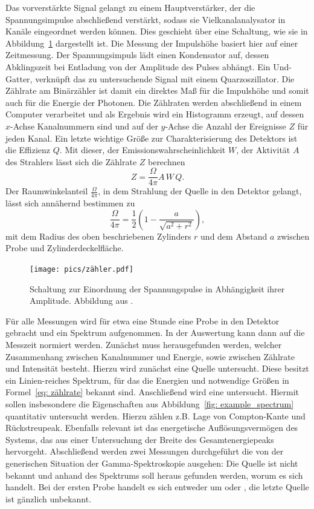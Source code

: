 Das vorverstärkte Signal gelangt zu einem Hauptverstärker, der die Spannungsimpulse abschließend verstärkt, sodass 
sie Vielkanalanalysator in Kanäle eingeordnet werden können. Dies geschieht über eine Schaltung, wie sie in 
Abbildung~\ref{fig: zaehler}
dargestellt ist. Die Messung der Impulshöhe basiert hier auf einer Zeitmessung. Der Spannungsimpuls lädt einen 
Kondensator auf, dessen Abklingszeit bei Entladung von der Amplitude des Pulses abhängt. Ein Und-Gatter, verknüpft 
das zu untersuchende Signal mit einem Quarzoszillator. Die Zählrate am Binärzähler ist damit ein direktes Maß für 
die Impulshöhe und somit auch für die Energie der Photonen. 
Die Zählraten werden abschließend in einem Computer verarbeitet und als Ergebnis wird ein Histogramm erzeugt, auf dessen 
$x$-Achse Kanalnummern sind und auf der $y$-Achse die Anzahl der Ereignisse $Z$ für jeden Kanal. 
Ein letzte wichtige Größe zur Charakterisierung des Detektors ist 
die Effizienz $Q$. Mit dieser, der Emissionswahrscheinlichkeit $W$, der Aktivität $A$ des Strahlers lässt sich die 
Zählrate $Z$ berechnen 
\begin{equation}
    Z = \frac{\Omega}{4\pi} A \, W \, Q.
    \label{eq: zählrate}
\end{equation}
Der Raumwinkelanteil $\frac{\Omega}{4\pi}$, in dem Strahlung der Quelle in den Detektor gelangt, lässt sich annähernd bestimmen zu 
\begin{equation}
    \frac{\Omega}{4\pi} = \frac{1}{2} \left( 1 - \frac{a}{\sqrt{a^2 + r^2}} \right),
    \label{eq: omega}
\end{equation}
mit dem Radius des oben beschriebenen Zylinders $r$ und dem Abstand $a$ zwischen Probe und Zylinderdeckelfläche. 
\begin{figure}
    \centering
    \texttt{[image: pics/zähler.pdf]}
    \caption{Schaltung zur Einordnung der Spannungspulse in Abhängigkeit ihrer Amplitude. Abbildung aus \cite{anleitungv18}.}
    \label{fig: zaehler}
\end{figure}

Für alle Messungen wird für etwa eine Stunde eine Probe in den Detektor gebracht und ein Spektrum aufgenommen. In der 
Auswertung kann dann auf die Messzeit normiert werden. 
Zunächst muss herausgefunden werden, welcher Zusammenhang zwischen Kanalnummer und Energie, sowie zwischen Zählrate und 
Intensität besteht. Hierzu wird zunächst eine  Quelle untersucht. Diese besitzt ein Linien-reiches Spektrum, für das 
die Energien und notwendige Größen in Formel~\eqref{eq: zählrate} bekannt sind. 
Anschließend wird eine  untersucht. Hiermit sollen insbesondere die Eigenschaften aus 
Abbildung~\ref{fig: example_spectrum} quantitativ untersucht werden. Hierzu zählen z.B. Lage von Compton-Kante und 
Rückstreupeak. Ebenfalls relevant ist das energetische Auflösungsvermögen des Systems, das aus einer Untersuchung der Breite 
des Gesamtenergiepeaks hervorgeht.
Abschließend werden zwei Messungen durchgeführt die von der generischen Situation der Gamma-Spektroskopie ausgehen: 
Die Quelle ist nicht bekannt und anhand des Spektrums soll heraus gefunden werden, worum es sich handelt. Bei der ersten 
Probe handelt es sich entweder um  oder , die letzte Quelle ist gänzlich unbekannt.